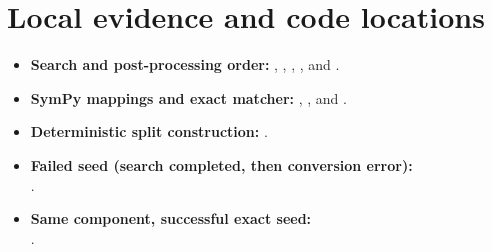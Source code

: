 \documentclass[10pt]{article}
\begin{document}
\section*{Local evidence and code locations}

\begin{itemize}
  \item \textbf{Search and post-processing order:}
        , , ,
        , and .
  \item \textbf{SymPy mappings and exact matcher:}
        , , and .
  \item \textbf{Deterministic split construction:} .
  \item \textbf{Failed seed (search completed, then conversion error):}\\
        .
  \item \textbf{Same component, successful exact seed:}\\
        .
\end{itemize}
\end{document}
